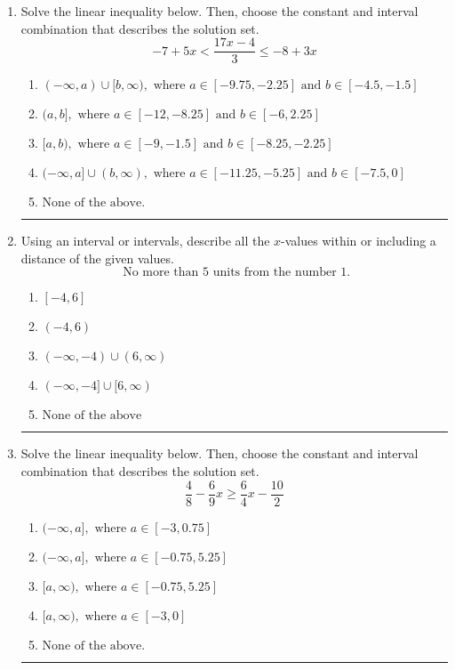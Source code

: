 \documentclass[14pt]{extbook}
\newcommand{\litem}[1]{\item#1\hspace*{-1cm}\rule{\textwidth}{0.4pt}}
\begin{document}
\begin{enumerate}
\litem{
Solve the linear inequality below. Then, choose the constant and interval combination that describes the solution set.\[ -7 + 5 x < \frac{17 x - 4}{3} \leq -8 + 3 x \]\begin{enumerate}[label=\Alph*.]
\item \( (-\infty, a) \cup [b, \infty), \text{ where } a \in [-9.75, -2.25] \text{ and } b \in [-4.5, -1.5] \)
\item \( (a, b], \text{ where } a \in [-12, -8.25] \text{ and } b \in [-6, 2.25] \)
\item \( [a, b), \text{ where } a \in [-9, -1.5] \text{ and } b \in [-8.25, -2.25] \)
\item \( (-\infty, a] \cup (b, \infty), \text{ where } a \in [-11.25, -5.25] \text{ and } b \in [-7.5, 0] \)
\item \( \text{None of the above.} \)

\end{enumerate} }
\litem{
Using an interval or intervals, describe all the $x$-values within or including a distance of the given values.\[ \text{ No more than } 5 \text{ units from the number } 1. \]\begin{enumerate}[label=\Alph*.]
\item \( [-4, 6] \)
\item \( (-4, 6) \)
\item \( (-\infty, -4) \cup (6, \infty) \)
\item \( (-\infty, -4] \cup [6, \infty) \)
\item \( \text{None of the above} \)

\end{enumerate} }
\litem{
Solve the linear inequality below. Then, choose the constant and interval combination that describes the solution set.\[ \frac{4}{8} - \frac{6}{9} x \geq \frac{6}{4} x - \frac{10}{2} \]\begin{enumerate}[label=\Alph*.]
\item \( (-\infty, a], \text{ where } a \in [-3, 0.75] \)
\item \( (-\infty, a], \text{ where } a \in [-0.75, 5.25] \)
\item \( [a, \infty), \text{ where } a \in [-0.75, 5.25] \)
\item \( [a, \infty), \text{ where } a \in [-3, 0] \)
\item \( \text{None of the above}. \)


\end{enumerate}}
\end{enumerate}
\end{document}
